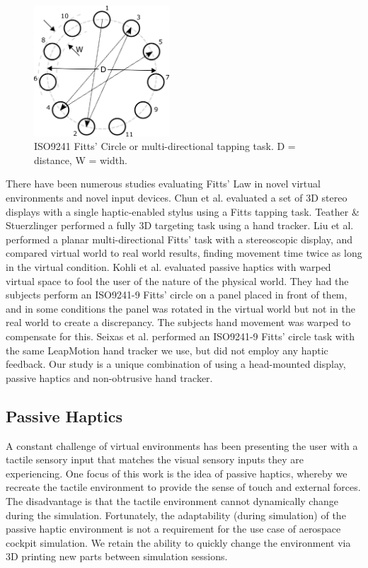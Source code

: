 \documentclass[]{aiaa-tc}%
\begin{document}
\begin{figure}[htb]
  \centering
  \includegraphics[width=0.45\textwidth]{figures/iso9241.png}
  \caption{ISO9241 Fitts' Circle or multi-directional tapping task. D = distance, W = width.}
  \label{fig:circle}
\end{figure}

There have been numerous studies evaluating Fitts' Law in novel virtual environments and novel input devices.
Chun et al.\cite{chun_evaluating_2004} evaluated a set of 3D stereo displays with a single haptic-enabled stylus using a Fitts tapping task.
Teather \& Stuerzlinger\cite{teather_pointing_2011} performed a fully 3D targeting task using a hand tracker.
Liu et al.\cite{liu_comparing_2009} performed a planar multi-directional Fitts' task with a stereoscopic display, and compared virtual world to real world results, finding movement time twice as long in the virtual condition.
Kohli et al.\cite{kohli_redirected_2012} evaluated passive haptics with warped virtual space to fool the user of the nature of the physical world.
They had the subjects perform an ISO9241-9 Fitts' circle on a panel placed in front of them, and in some conditions the panel was rotated in the virtual world but not in the real world to create a discrepancy.
The subjects hand movement was warped to compensate for this.
Seixas et al.\cite{seixas_one_2015} performed an ISO9241-9 Fitts' circle task with the same LeapMotion hand tracker we use, but did not employ any haptic feedback.
Our study is a unique combination of using a head-mounted display, passive haptics and non-obtrusive hand tracker.

\subsection{Passive Haptics}
A constant challenge of virtual environments has been presenting the user with a tactile sensory input that matches the visual sensory inputs they are experiencing.
One focus of this work is the idea of passive haptics, whereby we recreate the tactile environment to provide the sense of touch and external forces.
The disadvantage is that the tactile environment cannot dynamically change during the simulation.
Fortunately, the adaptability (during simulation) of the passive haptic environment is not a requirement for the use case of aerospace cockpit simulation.
We retain the ability to quickly change the environment via 3D printing new parts between simulation sessions.
\end{document}
